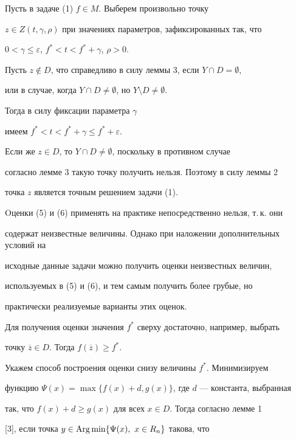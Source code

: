 \begin{notenonum}


Пусть в задаче (1) $f\in M$. Выберем произвольно точку 


$z\in Z(t,\gamma,\rho)$ при значениях параметров, зафиксированных так, что


$0<\gamma\le\varepsilon$, $f^*<t<f^*+\gamma$, $\rho>0$.


Пусть $z\notin D$, что справедливо в силу леммы 3, если $Y\cap D=\emptyset$, 


или в случае, когда $Y\cap D\ne\emptyset$, но $Y\setminus D\ne\emptyset$. 


Тогда в силу фиксации параметра $\gamma$


имеем $f^*<t<f^*+\gamma\le f^*+\varepsilon$.


Если же $z\in D$, то $Y\cap D\ne\emptyset$, поскольку в противном случае


согласно лемме 3 такую точку получить нельзя. Поэтому в силу леммы 2


точка $z$ является точным решением задачи (1). 


\end{notenonum}





Oценки (5) и (6) применять на практике непосредственно нельзя, т.\,к. они 


содержат неизвестные величины. Однако при наложении дополнительных условий на 


исходные данные задачи можно получить оценки неизвестных величин, 


используемых в (5) и (6), и тем самым получить более грубые, но 


практически реализуемые варианты этих оценок. 





Для получения оценки значения $f^*$ сверху достаточно, например, выбрать 


точку $\overline{z}\in D$. Тогда $f(\overline{z})\ge f^*$. 





Укажем способ построения оценки снизу величины $f^*$. Минимизируем


функцию $\Psi(x)=\max\{f(x)+d, g(x)\}$, где $d$ --- константа, выбранная


так, что $f(x)+d\ge g(x)$ для всех $x\in D$. Тогда согласно лемме 1


[3], если точка $y\in \Arg\min\{\Psi(x),\ x\in R_n\}$ такова, что



